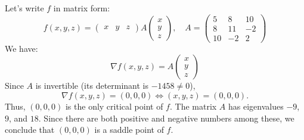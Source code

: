 \documentclass{exam}
\begin{document}
\begin{questions}
\begin{parts}
        \begin{solution}
            Let's write $f$ in matrix form:
            \[
                f(x,y,z) = \begin{pmatrix}
                    x&y&z
                \end{pmatrix}A\begin{pmatrix}
                    x\\y\\z
                \end{pmatrix},\quad
                A = \begin{pmatrix}
                    5 & 8 & 10\\8&11&-2\\10&-2&2
                \end{pmatrix}
            \]
            We have:
            \[
                \nabla f(x,y,z) = A\begin{pmatrix}x\\y\\z
                \end{pmatrix}
            \]
            Since $A$ is invertible (its determinant is $-1458\neq 0$),
            \[
                \nabla f(x,y,z)=(0,0,0)
                \Longleftrightarrow
                (x,y,z)=(0,0,0).
            \]
            Thus, $(0,0,0)$ is the only critical point of $f$.
            The matrix $A$ has eigenvalues $-9$, $9$, and $18$.
            Since there are both positive and negative numbers among these,
            we conclude that $(0,0,0)$ is a saddle point of $f$.
        \end{solution}
    \end{parts}
\end{questions}
\end{document}
